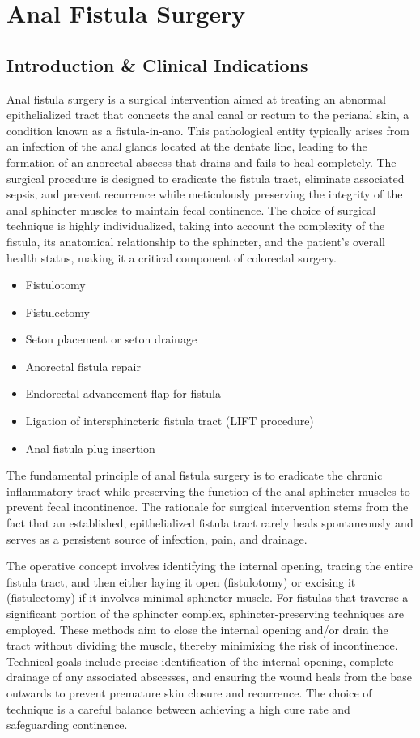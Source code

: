 \chapter{Anal Fistula Surgery}

\section*{Introduction \& Clinical Indications}
Anal fistula surgery is a surgical intervention aimed at treating an abnormal epithelialized tract that connects the anal canal or rectum to the perianal skin, a condition known as a fistula-in-ano. This pathological entity typically arises from an infection of the anal glands located at the dentate line, leading to the formation of an anorectal abscess that drains and fails to heal completely. The surgical procedure is designed to eradicate the fistula tract, eliminate associated sepsis, and prevent recurrence while meticulously preserving the integrity of the anal sphincter muscles to maintain fecal continence. The choice of surgical technique is highly individualized, taking into account the complexity of the fistula, its anatomical relationship to the sphincter, and the patient's overall health status, making it a critical component of colorectal surgery.

\begin{itemize}
  \item Fistulotomy
  \item Fistulectomy
  \item Seton placement or seton drainage
  \item Anorectal fistula repair
  \item Endorectal advancement flap for fistula
  \item Ligation of intersphincteric fistula tract (LIFT procedure)
  \item Anal fistula plug insertion
\end{itemize}

The fundamental principle of anal fistula surgery is to eradicate the chronic inflammatory tract while preserving the function of the anal sphincter muscles to prevent fecal incontinence. The rationale for surgical intervention stems from the fact that an established, epithelialized fistula tract rarely heals spontaneously and serves as a persistent source of infection, pain, and drainage.

The operative concept involves identifying the internal opening, tracing the entire fistula tract, and then either laying it open (fistulotomy) or excising it (fistulectomy) if it involves minimal sphincter muscle. For fistulas that traverse a significant portion of the sphincter complex, sphincter-preserving techniques are employed. These methods aim to close the internal opening and/or drain the tract without dividing the muscle, thereby minimizing the risk of incontinence. Technical goals include precise identification of the internal opening, complete drainage of any associated abscesses, and ensuring the wound heals from the base outwards to prevent premature skin closure and recurrence. The choice of technique is a careful balance between achieving a high cure rate and safeguarding continence.

